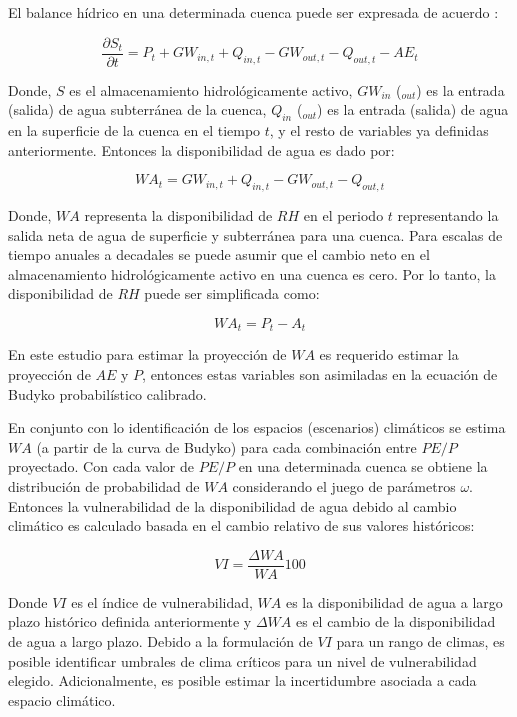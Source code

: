 \documentclass[12pt]{article}
\begin{document}
El balance hídrico en una determinada cuenca puede ser expresada de acuerdo \citep{Singh2015}:

\begin{equation}
\frac{\partial S_{t}}{\partial t} = P_{t} + GW_{in,t} + Q_{in,t} - GW_{out,t} - Q_{out,t} - AE_{t} 
\end{equation}

Donde, $S$ es el almacenamiento hidrológicamente activo, $GW_{in}$ ($_{out}$) es la entrada (salida) de agua subterránea de la cuenca, $Q_{in}$ ($_{out}$) es la entrada (salida) de agua en la superficie de la cuenca en el tiempo $t$, y el resto de variables ya definidas anteriormente. Entonces la disponibilidad de agua es dado por:

\begin{equation}
WA_{t} =  GW_{in,t} + Q_{in,t} - GW_{out,t} - Q_{out,t}
\end{equation}

Donde, $WA$ representa la disponibilidad de $RH$ en el periodo $t$ representando la salida neta de agua de superficie y subterránea para una cuenca. Para escalas de tiempo anuales a decadales se puede asumir que el cambio neto en el almacenamiento hidrológicamente activo en una cuenca es cero. Por lo tanto, la disponibilidad de $RH$ puede ser simplificada como: 

\begin{equation}
WA_{t} = P_{t} - A_{t}
\end{equation}

En este estudio para estimar la proyección de $WA$ es requerido estimar la proyección de $AE$ y $P$, entonces estas variables son asimiladas en la ecuación de Budyko probabilístico calibrado.

En conjunto con lo identificación de los espacios (escenarios) climáticos se estima $WA$ (a partir de la curva de Budyko) para cada combinación entre $PE/P$ proyectado. Con cada valor de $PE/P$ en una determinada cuenca se obtiene la distribución de probabilidad de $WA$ considerando el juego de parámetros $\omega$. Entonces la vulnerabilidad de la disponibilidad de agua debido al cambio climático es calculado basada en el cambio relativo de sus valores históricos:

\begin{equation}
VI = \frac{\Delta WA}{WA}100
\end{equation}

Donde $VI$ es el índice de vulnerabilidad, $WA$ es la disponibilidad de agua a largo plazo histórico definida anteriormente y $\Delta WA$ es el cambio de la disponibilidad de agua a largo plazo. Debido a la formulación de $VI$ para un rango de climas, es posible identificar umbrales de clima críticos para un nivel de vulnerabilidad elegido. Adicionalmente, es posible estimar la incertidumbre asociada a cada espacio climático.
\end{document}
